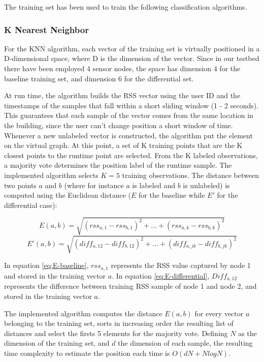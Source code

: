 The training set has been used to train the following classification algorithms.

\subsubsection{K Nearest Neighbor}
\label{subsubsec:knn}
For the KNN algorithm, each vector of the training set is virtually positioned in a D-dimensional space, where D is the dimension of the vector. Since in our testbed there have been employed 4 sensor nodes, the space has dimension 4 for the baseline training set, and dimension 6 for the differential set.

At run time, the algorithm builds the RSS vector using the user ID and the timestamps of the samples that fall within a short sliding window (1 - 2 seconds). This guarantees that each sample of the vector comes from the same location in the building, since the user can't change position a short window of time.
Whenever a new unlabeled vector is constructed, the algorithm put the element on the virtual graph. At this point, a set of K training points that are the K closest points to the runtime point are selected. From the K labeled observations, a majority vote determines the position label of the runtime sample. The implemented algorithm selects $K=5$ training observations.
The distance between two points $a$ and $b$ (where for instance $a$ is labeled and $b$ is unlabeled) is computed using the Euclidean distance ($E$ for the baseline while $E'$ for the differential case):

\begin{equation}\label{eq:E-baseline}
E(a,b)=\sqrt{(rss_{a,1} - rss_{b,1})^2 + ... + (rss_{a,k} - rss_{b,k})^2}
\end{equation}
\begin{equation}\label{eq:E-differential}
E'(a,b)=\sqrt{(diff_{a,12} - diff_{b,12})^2 + ... + (diff_{a,jk} - diff_{b,jk})^2}
\end{equation}

In equation \ref{eq:E-baseline}, $rss_{a,1}$ represents the RSS value captured by node 1 and stored in the training vector $a$. In equation \ref{eq:E-differential}, $Diff_{a,12}$ represents the difference between training RSS sample of node 1 and node 2, and stored in the training vector $a$.

\medskip
The implemented algorithm computes the distance $E(a,b)$ for every vector $a$ belonging to the training set, sorts in increasing order the resulting list of distances and select the firsts 5 elements for the majority vote. Defining $N$ as the dimension of the training set, and $d$ the dimension of each sample, the resulting time complexity to estimate the position each time is $O(dN + NlogN)$.

